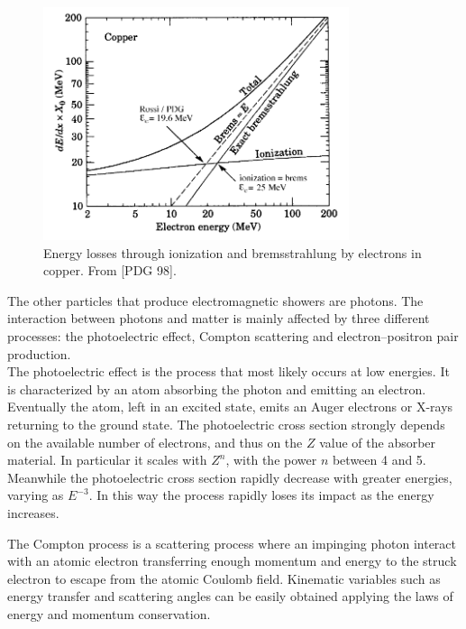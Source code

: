 \begin{figure}
	\centering
	\includegraphics[width=0.8\textwidth]{IMG/Cap2/Cu_rad_ion}
	\caption{Energy losses through ionization and bremsstrahlung by  electrons in copper. From [PDG 98].}
	\label{fig:Cu_rad_ion}
\end{figure}

The other particles that produce electromagnetic showers are photons. The interaction between photons and matter is mainly affected by three different processes: the photoelectric effect, Compton scattering and electron–positron pair production.\\

The photoelectric effect is the process that most likely occurs at low energies. It is characterized by an atom absorbing the photon and emitting an electron. Eventually the atom, left in an excited state, emits an Auger electrons or X-rays returning to the ground state. The photoelectric cross section strongly depends on the available number of  electrons,  and  thus  on  the $Z$ value  of  the  absorber  material. In particular it scales with $Z^n$, with the power $n$ between 4 and 5. Meanwhile the photoelectric cross section rapidly decrease with greater energies, varying as $E^{-3}$. In this way the process rapidly loses its impact as the energy increases. %

The Compton process is a scattering process where an impinging  photon interact with an atomic electron transferring enough momentum and energy to the struck electron to escape from the atomic Coulomb field. Kinematic variables such as energy transfer and scattering angles can be easily obtained applying the laws of energy and momentum conservation. 

